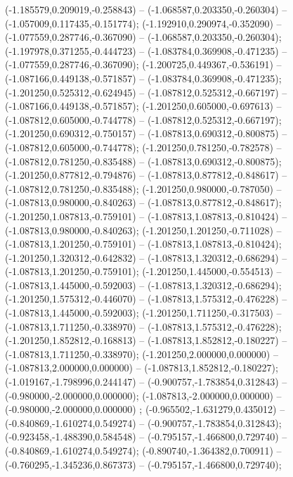  (-1.185579,0.209019,-0.258843) -- (-1.068587,0.203350,-0.260304) -- (-1.057009,0.117435,-0.151774);
 (-1.192910,0.290974,-0.352090) -- (-1.077559,0.287746,-0.367090) -- (-1.068587,0.203350,-0.260304);
 (-1.197978,0.371255,-0.444723) -- (-1.083784,0.369908,-0.471235) -- (-1.077559,0.287746,-0.367090);
 (-1.200725,0.449367,-0.536191) -- (-1.087166,0.449138,-0.571857) -- (-1.083784,0.369908,-0.471235);
 (-1.201250,0.525312,-0.624945) -- (-1.087812,0.525312,-0.667197) -- (-1.087166,0.449138,-0.571857);
 (-1.201250,0.605000,-0.697613) -- (-1.087812,0.605000,-0.744778) -- (-1.087812,0.525312,-0.667197);
 (-1.201250,0.690312,-0.750157) -- (-1.087813,0.690312,-0.800875) -- (-1.087812,0.605000,-0.744778);
 (-1.201250,0.781250,-0.782578) -- (-1.087812,0.781250,-0.835488) -- (-1.087813,0.690312,-0.800875);
 (-1.201250,0.877812,-0.794876) -- (-1.087813,0.877812,-0.848617) -- (-1.087812,0.781250,-0.835488);
 (-1.201250,0.980000,-0.787050) -- (-1.087813,0.980000,-0.840263) -- (-1.087813,0.877812,-0.848617);
 (-1.201250,1.087813,-0.759101) -- (-1.087813,1.087813,-0.810424) -- (-1.087813,0.980000,-0.840263);
 (-1.201250,1.201250,-0.711028) -- (-1.087813,1.201250,-0.759101) -- (-1.087813,1.087813,-0.810424);
 (-1.201250,1.320312,-0.642832) -- (-1.087813,1.320312,-0.686294) -- (-1.087813,1.201250,-0.759101);
 (-1.201250,1.445000,-0.554513) -- (-1.087813,1.445000,-0.592003) -- (-1.087813,1.320312,-0.686294);
 (-1.201250,1.575312,-0.446070) -- (-1.087813,1.575312,-0.476228) -- (-1.087813,1.445000,-0.592003);
 (-1.201250,1.711250,-0.317503) -- (-1.087813,1.711250,-0.338970) -- (-1.087813,1.575312,-0.476228);
 (-1.201250,1.852812,-0.168813) -- (-1.087813,1.852812,-0.180227) -- (-1.087813,1.711250,-0.338970);
 (-1.201250,2.000000,0.000000) -- (-1.087813,2.000000,0.000000) -- (-1.087813,1.852812,-0.180227);
 (-1.019167,-1.798996,0.244147) -- (-0.900757,-1.783854,0.312843) -- (-0.980000,-2.000000,0.000000);
 (-1.087813,-2.000000,0.000000) -- (-0.980000,-2.000000,0.000000) ;
 (-0.965502,-1.631279,0.435012) -- (-0.840869,-1.610274,0.549274) -- (-0.900757,-1.783854,0.312843);
 (-0.923458,-1.488390,0.584548) -- (-0.795157,-1.466800,0.729740) -- (-0.840869,-1.610274,0.549274);
 (-0.890740,-1.364382,0.700911) -- (-0.760295,-1.345236,0.867373) -- (-0.795157,-1.466800,0.729740);
